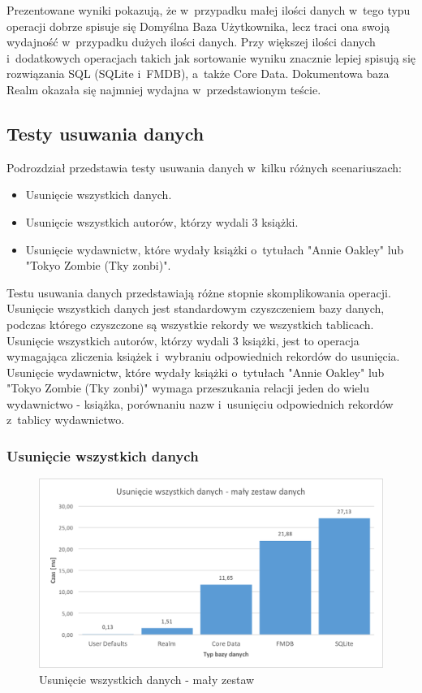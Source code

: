 Prezentowane wyniki pokazują, że w~przypadku małej ilości danych w~tego typu operacji dobrze spisuje się Domyślna Baza Użytkownika, lecz traci ona swoją wydajność w~przypadku dużych ilości danych. Przy większej ilości danych i~dodatkowych operacjach takich jak sortowanie wyniku znacznie lepiej spisują się rozwiązania SQL (SQLite i~FMDB), a~także Core Data. Dokumentowa baza Realm okazała się najmniej wydajna w~przedstawionym teście. 

\subsection{Testy usuwania danych}

Podrozdział przedstawia testy usuwania danych w~kilku różnych scenariuszach: 

\begin{itemize}
\item Usunięcie wszystkich danych.
\item Usunięcie wszystkich autorów, którzy wydali 3 książki.
\item Usunięcie wydawnictw, które wydały książki o~tytułach "Annie Oakley" lub "Tokyo Zombie (Tky zonbi)".
\end{itemize}

Testu usuwania danych przedstawiają różne stopnie skomplikowania operacji. Usunięcie wszystkich danych jest standardowym czyszczeniem bazy danych, podczas którego czyszczone są wszystkie rekordy we wszystkich tablicach. Usunięcie wszystkich autorów, którzy wydali 3 książki, jest to operacja wymagająca zliczenia książek i~wybraniu odpowiednich rekordów do usunięcia. Usunięcie wydawnictw, które wydały książki o~tytułach "Annie Oakley" lub "Tokyo Zombie (Tky zonbi)" wymaga przeszukania relacji jeden do wielu wydawnictwo - książka, porównaniu nazw i~usunięciu odpowiednich rekordów z~tablicy wydawnictwo. 

\subsubsection{Usunięcie wszystkich danych}

\begin{figure}[H]
\centering
	\includegraphics[width=15cm]{img/delete_data/delete_all/delete_all_small_test.png}
	\caption{Usunięcie wszystkich danych - mały zestaw}
	\label{fig: delete-all-small}
\end{figure}

